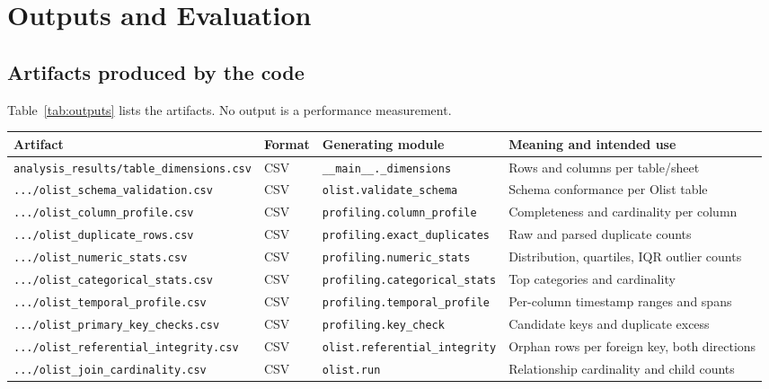 \documentclass[11pt,a4paper]{article}
\newcommand{\code}[1]{\texttt{#1}}
\begin{document}
\section{Outputs and Evaluation}
\label{sec:outputs}
\subsection{Artifacts produced by the code}
Table~\ref{tab:outputs} lists the artifacts. No output is a performance measurement.

\begin{table}[H]
\centering
\small
\begin{tabularx}{\textwidth}{L{5.0cm}L{1.6cm}L{4.2cm}X}
\toprule
\textbf{Artifact} & \textbf{Format} & \textbf{Generating module} & \textbf{Meaning and intended use} \\
\midrule
\code{analysis\_results/table\_dimensions.csv} & CSV & \code{\_\_main\_\_.\_dimensions} & Rows and columns per table/sheet \\
\code{.../olist\_schema\_validation.csv} & CSV & \code{olist.validate\_schema} & Schema conformance per Olist table \\
\code{.../olist\_column\_profile.csv} & CSV & \code{profiling.column\_profile} & Completeness and cardinality per column \\
\code{.../olist\_duplicate\_rows.csv} & CSV & \code{profiling.exact\_duplicates} & Raw and parsed duplicate counts \\
\code{.../olist\_numeric\_stats.csv} & CSV & \code{profiling.numeric\_stats} & Distribution, quartiles, IQR outlier counts \\
\code{.../olist\_categorical\_stats.csv} & CSV & \code{profiling.\allowbreak categorical\_stats} & Top categories and cardinality \\
\code{.../olist\_temporal\_profile.csv} & CSV & \code{profiling.temporal\_profile} & Per-column timestamp ranges and spans \\
\code{.../olist\_primary\_key\_checks.csv} & CSV & \code{profiling.key\_check} & Candidate keys and duplicate excess \\
\code{.../olist\_referential\_integrity.csv} & CSV & \code{olist.referential\_integrity} & Orphan rows per foreign key, both directions \\
\code{.../olist\_join\_cardinality.csv} & CSV & \code{olist.run} & Relationship cardinality and child counts \\

\end{tabularx}
\end{table}
\end{document}
